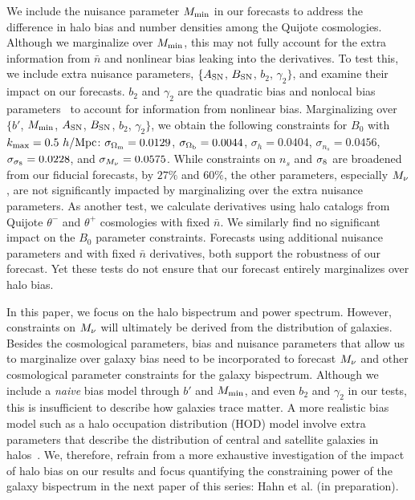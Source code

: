 We include the nuisance parameter $M_{\rm min}$ in our forecasts to address the 
difference in halo bias and number densities among the Quijote cosmologies. Although 
we marginalize over $M_{\rm min}$, this may not fully account for the extra 
information from $\bar{n}$ and nonlinear bias leaking into the derivatives. 
To test this, we include extra nuisance parameters, $\{A_{\rm SN}$, 
$B_{\rm SN}$, $b_2$, $\gamma_2\}$, and examine their impact on our forecasts. 
$b_2$ and $\gamma_2$ 
are the quadratic bias and nonlocal bias parameters~\citep{chan2012, sheth2013}
to account for information from nonlinear bias. Marginalizing over $\{b'$, 
$M_{\rm min}$, $A_{\rm SN}$, $B_{\rm SN}$, $b_2$, $\gamma_2\}$, we obtain the 
following constraints for $B_0$ with $k_{\rm max} = 0.5~h/{\rm Mpc}$:
$\sigma_{\Omega_{\rm m}} = 0.0129$, $\sigma_{\Omega_{\rm b}} = 0.0044$, $\sigma_h=0.0404$, 
$\sigma_{n_s}=0.0456$, $\sigma_{\sigma_8}=0.0228$, and $\sigma_{M_\nu}=0.0575$. 
While constraints on $n_s$ and $\sigma_8$ are broadened from our fiducial 
forecasts, by $27\%$ and $60\%$, the other parameters, especially $M_\nu$, 
are not significantly impacted by marginalizing over the extra nuisance 
parameters. As another test, we calculate derivatives using halo catalogs 
from Quijote $\theta^{-}$ and $\theta^{+}$ cosmologies with fixed $\bar{n}$. 
We similarly find no significant impact on the $B_0$ parameter constraints.
Forecasts using additional nuisance parameters and with fixed $\bar{n}$ 
derivatives, both support the robustness of our forecast. Yet these 
tests do not ensure that our forecast entirely marginalizes over halo bias. 

In this paper, we focus on the halo bispectrum and power spectrum. However,   
constraints on $M_\nu$ will ultimately be derived from the distribution of 
galaxies. Besides the cosmological parameters, bias and nuisance parameters 
that allow us to marginalize over galaxy bias need to be incorporated to 
forecast $M_\nu$ and other cosmological parameter constraints for the 
galaxy bispectrum. Although we include a \emph{naive} bias model through $b'$ 
and $M_{\rm min}$, and even $b_2$ and $\gamma_2$ in our tests, this is 
insufficient to describe how galaxies trace matter. A more realistic bias model 
such as a halo occupation distribution (HOD) model involve extra parameters 
that describe the distribution of central and satellite galaxies in 
halos~\citep[\emph{e.g.}][]{zheng2005,leauthaud2012,tinker2013,zentner2016,vakili2019}. 
We, therefore, refrain from a more exhaustive investigation of the impact of 
halo bias on our results and focus quantifying the constraining power of 
the galaxy bispectrum in the next paper of this series: Hahn et al. (in preparation). 

